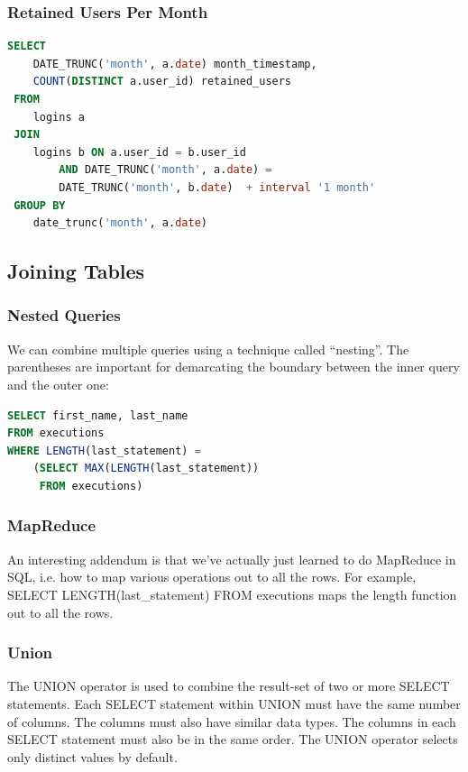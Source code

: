 \documentclass{article}
\begin{document}
\subsubsection{Retained Users Per Month}

\vspace{8pt} \begin{lstlisting}[language=SQL]
SELECT 
    DATE_TRUNC('month', a.date) month_timestamp, 
    COUNT(DISTINCT a.user_id) retained_users 
 FROM 
    logins a 
 JOIN 
    logins b ON a.user_id = b.user_id 
        AND DATE_TRUNC('month', a.date) = 
        DATE_TRUNC('month', b.date)  + interval '1 month'
 GROUP BY 
    date_trunc('month', a.date)
\end{lstlisting}

\subsection{Joining Tables}
\subsubsection{Nested Queries}
We can combine multiple queries using a technique called ``nesting”. The parentheses are important for demarcating the boundary between the inner query and the outer one:

\vspace{8pt} \begin{lstlisting}[language=SQL]
SELECT first_name, last_name
FROM executions
WHERE LENGTH(last_statement) =
    (SELECT MAX(LENGTH(last_statement))
     FROM executions)
\end{lstlisting} \vspace{8pt}

\subsubsection{MapReduce}

An interesting addendum is that we've actually just learned to do MapReduce in SQL, i.e. how to map various operations out to all the rows. For example, SELECT LENGTH(last\_statement) FROM executions maps the length function out to all the rows.

\subsubsection{Union}

The UNION operator is used to combine the result-set of two or more SELECT statements. Each SELECT statement within UNION must have the same number of columns. The columns must also have similar data types. The columns in each SELECT statement must also be in the same order. The UNION operator selects only distinct values by default. 
\end{document}
